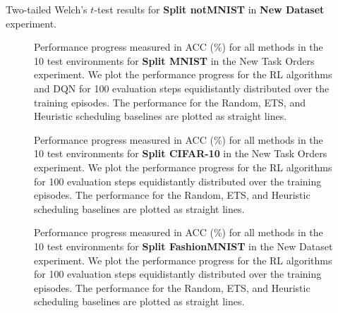 \begin{table}[t]
	\centering
	\caption{Two-tailed Welch's $t$-test results for \textbf{Split notMNIST} in \textbf{New Dataset} experiment. 
	}
	\vspace{-3mm}
	\resizebox{0.99\textwidth}{!}{
		
	}
	\label{tab:t_test_new_dataset_notmnist}
\end{table}



\clearpage
\begin{figure}[t]
  \centering
  \setlength{\figwidth}{0.26\textwidth}
  \setlength{\figheight}{.14\textheight}
  
  \vspace{-3mm}
  \caption{Performance progress measured in ACC (\%) for all methods in the 10 test environments for {\bf Split MNIST} in the New Task Orders experiment. We plot the performance progress for the RL algorithms and DQN for 100 evaluation steps equidistantly distributed over the training episodes. The performance for the Random, ETS, and Heuristic scheduling baselines are plotted as straight lines.  }
  \label{fig:policy_rewards_mnist_paperD}
  \vspace{-3mm}
\end{figure}


\begin{figure}[t]
  \centering
  \setlength{\figwidth}{0.26\textwidth}
  \setlength{\figheight}{.14\textheight}
  
  \vspace{-3mm}
  \caption{Performance progress measured in ACC (\%) for all methods in the 10 test environments for {\bf Split CIFAR-10} in the New Task Orders experiment. We plot the performance progress for the RL algorithms for 100 evaluation steps equidistantly distributed over the training episodes. The performance for the Random, ETS, and Heuristic scheduling baselines are plotted as straight lines.  }
  \label{fig:policy_rewards_cifar10_paperD}
  \vspace{-3mm}
\end{figure}

\clearpage

\begin{figure}[t]
	\centering
	\setlength{\figwidth}{0.26\textwidth}
	\setlength{\figheight}{.14\textheight}
	
	\vspace{-3mm}
	\caption{Performance progress measured in ACC (\%) for all methods in the 10 test environments for {\bf Split FashionMNIST} in the New Dataset experiment. We plot the performance progress for the RL algorithms for 100 evaluation steps equidistantly distributed over the training episodes. The performance for the Random, ETS, and Heuristic scheduling baselines are plotted as straight lines.  }
	\label{fig:policy_rewards_fashionmnist_new_dataset_paperD}
	\vspace{-3mm}
\end{figure}

